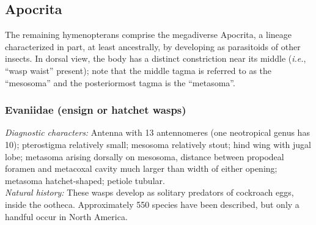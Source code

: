 \documentclass[letterpaper, 11pt]{article}
\begin{document}
\subsection{Apocrita}
The remaining hymenopterans comprise the megadiverse Apocrita, a lineage characterized in part, at least ancestrally, by developing as parasitoids of other insects. In dorsal view, the body has a distinct constriction near its middle (\textit{i.e.}, ``wasp waist'' present); note that the middle tagma is referred to as the ``mesosoma'' and the posteriormost tagma is the ``metasoma''. \\

\subsubsection{Evaniidae (ensign or hatchet wasps)}
\noindent{}\textit{Diagnostic characters:} Antenna with 13 antennomeres (one neotropical genus has 10); pterostigma relatively small; mesosoma relatively stout; hind wing with jugal lobe; metasoma arising dorsally on mesosoma, distance between propodeal foramen and metacoxal cavity much larger than width of either opening; metasoma hatchet-shaped; petiole tubular.\\

\noindent{}\textit{Natural history:} These wasps develop as solitary predators of cockroach eggs, inside the ootheca. Approximately 550 species have been described, but only a handful occur in North America.\\
\end{document}
